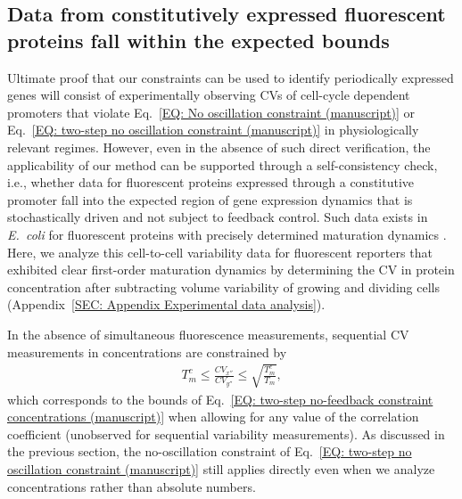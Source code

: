 \documentclass[%
 reprint,prx,
superscriptaddress,
%
%
%
%
%
%
%
%
%
 amsmath,amssymb,
 aps,
%
%
%
%
%
%
]{revtex4-2}
\begin{document}
{
\subsection{Data from constitutively expressed fluorescent proteins fall within the expected bounds}\vspace{-.75em}
%
Ultimate proof that our constraints can be used to identify periodically expressed genes will consist of experimentally observing CVs of cell-cycle dependent promoters that violate Eq.~\eqref{EQ: No oscillation constraint (manuscript)} or Eq.~\eqref{EQ: two-step no oscillation constraint (manuscript)} in physiologically relevant regimes. However, even in the absence of such direct verification, the applicability of our method can be supported through a self-consistency check, i.e., whether data for fluorescent proteins expressed through a constitutive promoter fall into the expected region of gene expression dynamics that is stochastically driven and not subject to feedback control. Such data exists in \emph{E.~coli} for fluorescent proteins with precisely determined maturation dynamics \cite{Balleza2018}. Here, we analyze this cell-to-cell variability data for fluorescent reporters that exhibited clear first-order maturation dynamics by determining the CV in protein concentration after subtracting volume variability of growing and dividing cells (Appendix~\ref{SEC: Appendix Experimental data analysis}). 
}

{
In the absence of simultaneous fluorescence measurements, sequential CV measurements in concentrations are constrained by 
\begin{align}
    T_{m}^{c} \leqslant \frac{CV_{x''}}{CV_{y''}} \leqslant \sqrt{\frac{T_{m}^{c}}{T_{m}}},
    \label{EQ: two-step sequential no-feedback constraint (manuscript)}
\end{align}
which corresponds to the bounds of Eq.~\eqref{EQ: two-step no-feedback constraint concentrations (manuscript)} when allowing for any value of the correlation coefficient (unobserved for sequential variability measurements). As discussed in the previous section, the no-oscillation constraint of Eq.~\eqref{EQ: two-step no oscillation constraint (manuscript)} still applies directly even when we analyze concentrations rather than absolute numbers.
%
%
%
}
\end{document}
